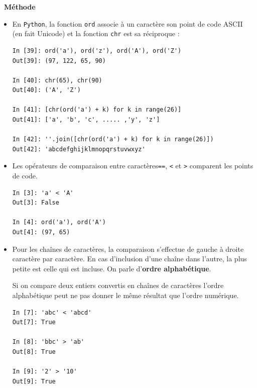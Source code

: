 \documentclass[a4paper, french, 12pt]{article}  %
\newcounter{def}
\newenvironment{methode}[1]
{\par \medskip    \noindent  
 \begin {bclogo}[arrondi =0.1,logo=\bcoutil, marge=4,noborder = true] {~\textbf{Méthode}   {\itshape #1} }  \par}
{
\end{bclogo}
 \par \bigskip }
\begin{document}
\begin{methode}{}

\begin{itemize}[label=]
\item En \texttt{Python}, la fonction \texttt{ord} associe à un caractère son point de code ASCII (en fait Unicode) et la fonction \texttt{chr} est sa réciproque :

\begin{lstlisting}
In [39]: ord('a'), ord('z'), ord('A'), ord('Z')
Out[39]: (97, 122, 65, 90)

In [40]: chr(65), chr(90)
Out[40]: ('A', 'Z')

In [41]: [chr(ord('a') + k) for k in range(26)]
Out[41]: ['a', 'b', 'c', ..... ,'y', 'z']

In [42]: ''.join([chr(ord('a') + k) for k in range(26)])
Out[42]: 'abcdefghijklmnopqrstuvwxyz'
\end{lstlisting}

\item Les opérateurs de comparaison entre caractères\texttt{==}, \texttt{<} et \texttt{>} comparent les points de code.



\begin{lstlisting}[style=compil]
In [3]: 'a' < 'A'                                                               
Out[3]: False

In [4]: ord('a'), ord('A')                                                      
Out[4]: (97, 65)
\end{lstlisting}

\item Pour les chaînes de caractères, la comparaison s'effectue  de gauche à droite caractère par caractère. En cas d'inclusion d'une chaîne dans l'autre, la plus petite est celle qui est incluse. On parle  d'\textbf{ordre alphabétique}.

\bcattention{}  Si on compare deux entiers convertis en chaînes de caractères l'ordre alphabétique peut ne pas donner le même résultat que l'ordre numérique.

\begin{lstlisting}[style=compil]
In [7]: 'abc' < 'abcd'                                                          
Out[7]: True

In [8]: 'bbc' > 'ab'                                                            
Out[8]: True

In [9]: '2' > '10'                                                              
Out[9]: True

\end{lstlisting}

\end{itemize}

\end{methode}
\end{document}
